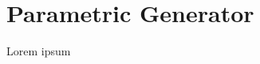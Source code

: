 \documentclass[../main.tex]{subfiles}
\begin{document}
\chapter{Parametric Generator}

Lorem ipsum
\end{document}
